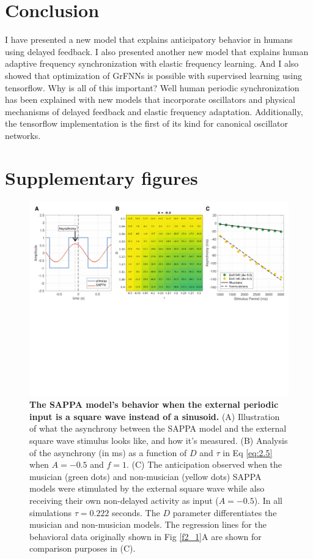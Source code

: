 \documentclass{report}
\begin{document}
\chapter{Conclusion}
I have presented a new model that explains anticipatory behavior in humans using delayed feedback. I also presented another new model that explains human adaptive frequency synchronization with elastic frequency learning. And I also showed that optimization of GrFNNs is possible with supervised learning using tensorflow. Why is all of this important? Well human periodic synchronization has been explained with new models that incorporate oscillators and physical mechanisms of delayed feedback and elastic frequency adaptation. Additionally, the tensorflow implementation is the first of its kind for canonical oscillator networks.

\appendix
\chapter{Supplementary figures}
\begin{figure}
    \centering
    \includegraphics[width=1.0\textwidth]{figures/figS_1.png}
    \caption[The SAPPA model's behavior when the external periodic input is a square wave instead of a sinusoid]{\textbf{The SAPPA model's behavior when the external periodic input is a square wave instead of a sinusoid.} (A) Illustration of what the asynchrony between the SAPPA model and the external square wave stimulus looks like, and how it's measured. (B) Analysis of the asynchrony (in ms) as a function of $D$ and $\tau$ in Eq \eqref{eq:2.5} when $A = -0.5$ and $f = 1$. (C) The anticipation observed when the musician (green dots) and non-musician (yellow dots) SAPPA models were stimulated by the external square wave while also receiving their own non-delayed activity as input ($A = -0.5$). In all simulations $\tau = 0.222$ seconds. The $D$ parameter differentiates the musician and non-musician models. The regression lines for the behavioral data originally shown in Fig \ref{f2_1}A are shown for comparison purposes in (C).}
    \label{fS_1}
\end{figure}
\end{document}
